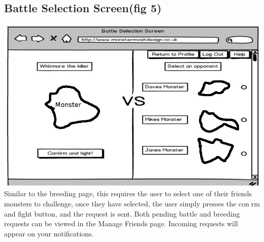 \documentclass{project}
\begin{document}
\subsection{Battle Selection Screen(fig 5)}
\includegraphics[scale=0.5]{battleSelection.jpg}\\
Similar to the breeding page, this requires the user to select one of their friends
monsters to challenge, once they have selected, the user simply presses the conrm
and fight button, and the request is sent.
Both pending battle and breeding requests can be viewed in the Manage Friends
page. Incoming requests will appear on your notifications.
\end{document}

